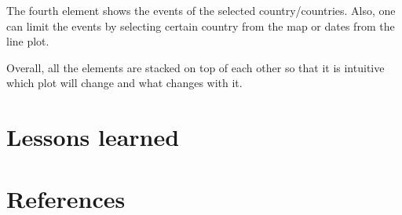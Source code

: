 \documentclass[11pt]{article}
\begin{document}
The fourth element shows the events of the selected country/countries. Also, one can limit the events by selecting certain country from the map or dates from the line plot.

Overall, all the elements are stacked on top of each other so that it is intuitive which plot will change and what changes with it.


\section{Lessons learned}


\section{References}
\end{document}
